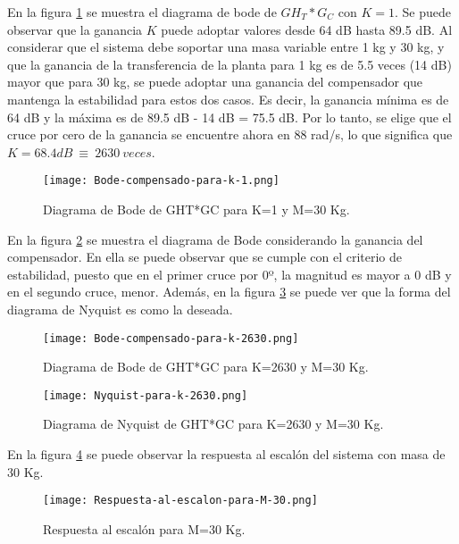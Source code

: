 \noindent En la figura \ref{fig:bode-compensado-para-k-1} se muestra el diagrama de bode de ${GH}_T*G_C$ con $K=1$. Se puede observar que la ganancia $K$ puede adoptar valores desde 64 dB hasta 89.5 dB. Al considerar que el sistema debe soportar una masa variable entre 1 kg y 30 kg, y que la ganancia de la transferencia de la planta para 1 kg es de 5.5 veces (14 dB) mayor que para 30 kg, se puede adoptar una ganancia del compensador que mantenga la estabilidad para estos dos casos. Es decir, la ganancia m\'{i}nima es de 64 dB y la m\'{a}xima es de 89.5 dB - 14 dB = 75.5 dB. Por lo tanto, se elige que el cruce por cero de la ganancia se encuentre ahora en 88 rad/s, lo que significa que $K=68.4dB\ \equiv \ 2630\ veces$.


\begin{figure}[H]
	\centering
	\texttt{[image: Bode-compensado-para-k-1.png]}
	\caption{Diagrama de Bode de GHT*GC para K=1 y M=30 Kg.}
	\label{fig:bode-compensado-para-k-1}
\end{figure}


\noindent En la figura \ref{fig:bode-compensado-para-k-2630} se muestra el diagrama de Bode considerando la ganancia del compensador. En ella se puede observar que se  cumple con el criterio de estabilidad, puesto que en el primer cruce por 0º, la magnitud es mayor a 0 dB y en el segundo cruce, menor. Adem\'{a}s, en la figura \ref{fig:nyquist-para-k-2630} se puede ver que la forma del diagrama de Nyquist es como la deseada.

\begin{figure}[H]
	\centering
	\texttt{[image: Bode-compensado-para-k-2630.png]}
	\caption{Diagrama de Bode de GHT*GC para K=2630 y M=30 Kg.}
	\label{fig:bode-compensado-para-k-2630}
\end{figure}

\begin{figure}[H]
	\centering
	\texttt{[image: Nyquist-para-k-2630.png]}
	\caption{Diagrama de Nyquist de GHT*GC para K=2630 y M=30 Kg.}
	\label{fig:nyquist-para-k-2630}
\end{figure}

\noindent En la figura \ref{fig:respuesta-al-escalon-para-M-30} se puede observar la respuesta al escal\'{o}n del sistema con masa de 30 Kg.


\begin{figure}[H]
	\centering
	\texttt{[image: Respuesta-al-escalon-para-M-30.png]}
	\caption{Respuesta al escalón para M=30 Kg.}
	\label{fig:respuesta-al-escalon-para-M-30}
\end{figure}

